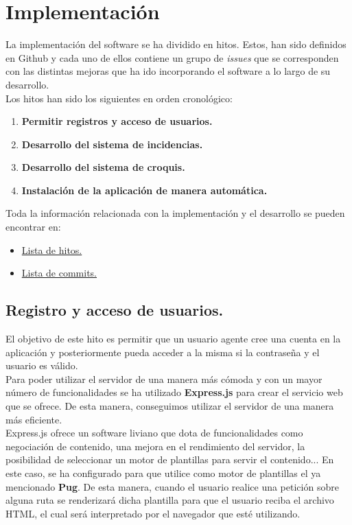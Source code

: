 \chapter{Implementación}

La implementación del software se ha dividido en hitos. Estos, han sido definidos en Github
y cada uno de ellos contiene un grupo de \textit{issues} que se corresponden con las distintas
mejoras que ha ido incorporando el software a lo largo de su desarrollo.\\

Los hitos han sido los siguientes en orden cronológico:

\begin{enumerate}
	\item \textbf{Permitir registros y acceso de usuarios.}
	\item \textbf{Desarrollo del sistema de incidencias.}
	\item \textbf{Desarrollo del sistema de croquis.}
	\item \textbf{Instalación de la aplicación de manera automática.}
\end{enumerate}

Toda la información relacionada con la implementación y el desarrollo se pueden encontrar en:

\begin{itemize}
	\item \href{https://github.com/Cerv1/Chief/milestones}{Lista de hitos.}
	\item \href{https://github.com/Cerv1/Chief/commits}{Lista de commits.}
\end{itemize}

\newpage

\section{Registro y acceso de usuarios.}
El objetivo de este hito es permitir que un usuario agente cree una cuenta en la aplicación 
y posteriormente pueda acceder a la misma si la contraseña y el usuario es válido. \\

Para poder utilizar el servidor de una manera más cómoda y con un mayor número de funcionalidades se ha utilizado
\textbf{Express.js}\cite{express} para crear el servicio web que se ofrece. De esta manera, conseguimos utilizar el 
servidor de una manera más eficiente.\\

Express.js ofrece un software liviano que dota de funcionalidades como negociación de contenido, una mejora en el 
rendimiento del servidor, la posibilidad de seleccionar un motor de plantillas para servir el contenido... En este caso,
se ha configurado para que utilice como motor de plantillas el ya mencionado \textbf{Pug}. De esta manera, cuando el usuario
realice una petición sobre alguna ruta se renderizará dicha plantilla para que el usuario reciba el archivo HTML, el cual
será interpretado por el navegador que esté utilizando.\\ 

